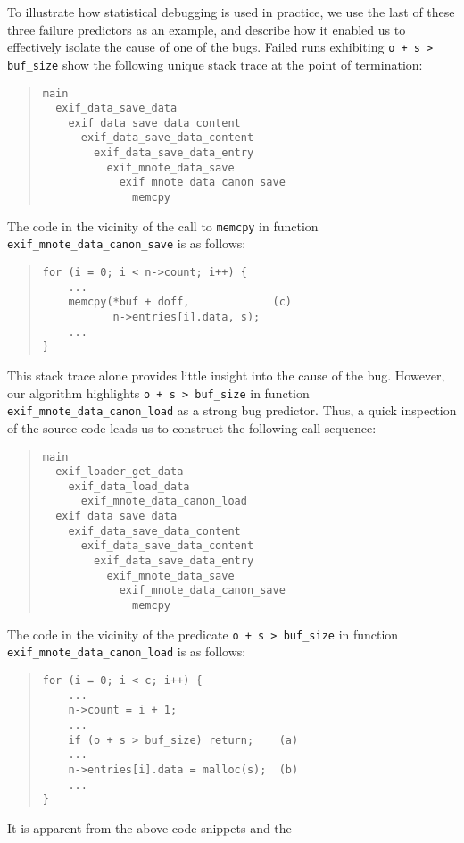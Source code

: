 To illustrate how statistical debugging is used in practice, we
use the last of these three failure predictors as an example, and
describe how it enabled us to
effectively isolate the cause of one of the bugs.  Failed runs
exhibiting \texttt{o + s > buf\_size} show the following unique stack
trace at the point of termination:
\begin{quote}
  \small
\begin{verbatim}
main
  exif_data_save_data
    exif_data_save_data_content
      exif_data_save_data_content
        exif_data_save_data_entry
          exif_mnote_data_save
            exif_mnote_data_canon_save
              memcpy
\end{verbatim}
\end{quote}
The code in the vicinity of the call to \texttt{memcpy} in function
\texttt{exif\_mnote\_data\_canon\_save} is as follows:
\begin{quote}
\begin{verbatim}
for (i = 0; i < n->count; i++) {
    ...
    memcpy(*buf + doff,             (c)
           n->entries[i].data, s);
    ...
}
\end{verbatim}
\end{quote}
This stack trace alone provides little insight into the cause of the
bug.  However, our algorithm highlights \texttt{o + s > buf\_size} in
function \texttt{exif\_mnote\_data\_canon\_load} as a strong bug
predictor.  Thus, a quick inspection of the source code leads us to
construct the following call sequence:
\begin{quote}
  \small
\begin{verbatim}
main
  exif_loader_get_data
    exif_data_load_data
      exif_mnote_data_canon_load
  exif_data_save_data
    exif_data_save_data_content
      exif_data_save_data_content
        exif_data_save_data_entry
          exif_mnote_data_save
            exif_mnote_data_canon_save
              memcpy
\end{verbatim}
\end{quote}
The code in the vicinity of the predicate \texttt{o + s > buf\_size}
in function \texttt{exif\_mnote\_data\_canon\_load} is as follows:
\begin{quote}
\begin{verbatim}
for (i = 0; i < c; i++) {
    ...
    n->count = i + 1;
    ...
    if (o + s > buf_size) return;    (a)
    ...
    n->entries[i].data = malloc(s);  (b)
    ...
}
\end{verbatim}
\end{quote}
It is apparent from the above code snippets and the
